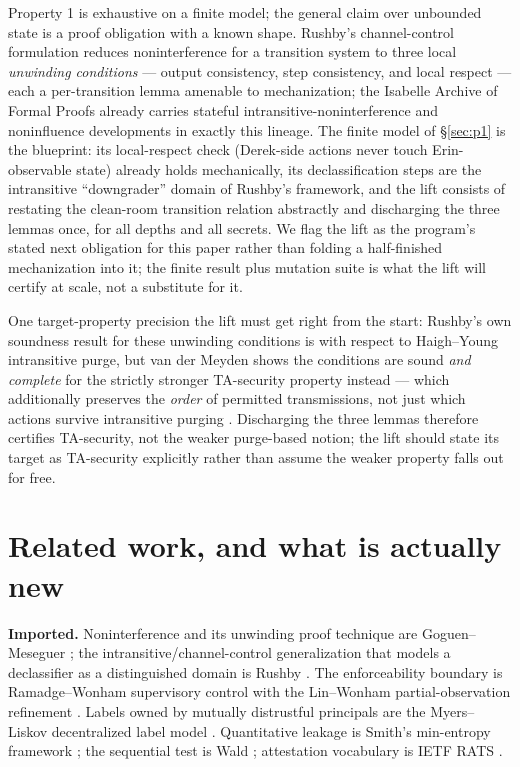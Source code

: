 \documentclass[11pt,a4paper]{article}
\begin{document}
Property 1 is exhaustive on a finite model; the general claim over unbounded state is a proof obligation with a known shape.
Rushby's channel-control formulation \cite{rushby} reduces noninterference for a transition system to three local \emph{unwinding
conditions} --- output consistency, step consistency, and local respect --- each a per-transition lemma amenable to mechanization;
the Isabelle Archive of Formal Proofs already carries stateful intransitive-noninterference and noninfluence developments in
exactly this lineage. The finite model of \S\ref{sec:p1} is the blueprint: its local-respect check (Derek-side actions never touch
Erin-observable state) already holds mechanically, its declassification steps are the intransitive ``downgrader'' domain of
Rushby's framework, and the lift consists of restating the clean-room transition relation abstractly and discharging the three
lemmas once, for all depths and all secrets. We flag the lift as the program's stated next obligation for this paper rather than
folding a half-finished mechanization into it; the finite result plus mutation suite is what the lift will certify at scale, not a
substitute for it.

One target-property precision the lift must get right from the start: Rushby's own soundness result for these unwinding
conditions is with respect to Haigh--Young intransitive purge, but van der Meyden shows the conditions are sound \emph{and
complete} for the strictly stronger TA-security property instead --- which additionally preserves the \emph{order} of
permitted transmissions, not just which actions survive intransitive purging \cite{vdm07}. Discharging the three lemmas
therefore certifies TA-security, not the weaker purge-based notion; the lift should state its target as TA-security explicitly
rather than assume the weaker property falls out for free.

\section{Related work, and what is actually new}\label{sec:related}

\textbf{Imported.} Noninterference and its unwinding proof technique are Goguen--Meseguer
\cite{goguen-meseguer-82,goguen-meseguer-84}; the intransitive/channel-control generalization that models a declassifier as a
distinguished domain is Rushby \cite{rushby}. The enforceability boundary is Ramadge--Wonham supervisory control
\cite{ramadge-wonham} with the Lin--Wonham partial-observation refinement \cite{lin-wonham}. Labels owned by mutually distrustful
principals are the Myers--Liskov decentralized label model \cite{myers-liskov}. Quantitative leakage is Smith's min-entropy
framework \cite{smith-qif}; the sequential test is Wald \cite{wald,wald-wolfowitz}; attestation vocabulary is IETF RATS
\cite{rats}.
\end{document}
